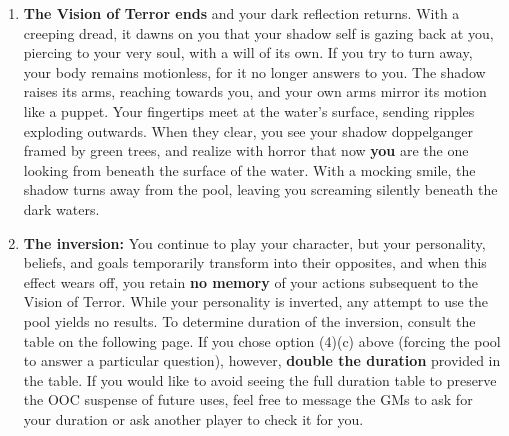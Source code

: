 {{\begin{enumerate}
		\item {\bf The Vision of Terror ends} and your dark reflection returns. With a creeping dread, it dawns on you that your shadow self is gazing back at you, piercing to your very soul, with a will of its own. If you try to turn away, your body remains motionless, for it no longer answers to you. The shadow raises its arms, reaching towards you, and your own arms mirror its motion like a puppet. Your fingertips meet at the water’s surface, sending ripples exploding outwards. When they clear, you see your shadow doppelganger framed by green trees, and realize with horror that now {\bf you} are the one looking from beneath the surface of the water. With a mocking smile, the shadow turns away from the pool, leaving you screaming silently beneath the dark waters. 
		\item {\bf The inversion:} You continue to play your character, but your personality, beliefs, and goals temporarily transform into their opposites, and when this effect wears off, you retain {\bf no memory} of your actions subsequent to the Vision of Terror. While your personality is inverted, any attempt to use the pool yields no results. To determine duration of the inversion, consult the table on the following page. If you chose option (4)(c) above (forcing the pool to answer a particular question), however, {\bf double the duration} provided in the table. If you would like to avoid seeing the full duration table to preserve the OOC suspense of future uses, feel free to message the GMs to ask for your duration or ask another player to check it for you.
	\end{enumerate}
	}
	\s\MYmems {\mPoolVisionOne{}\mPoolVisionTwo{}\mPoolVisionThree{}\mPoolVisionFour{}\mPoolVisionFive{}\mPoolVisionSix{}\mPoolVisionSeven{}\mPoolVisionEight{}\mPoolVisionNine{}}
}

